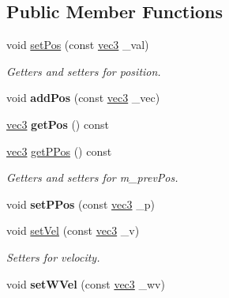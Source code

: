 \subsection*{Public Member Functions}
\begin{DoxyCompactItemize}
\item 
\hypertarget{classbase_a90093f488dc92a1eede40eb47b622ef7}{void \hyperlink{classbase_a90093f488dc92a1eede40eb47b622ef7}{set\-Pos} (const \hyperlink{structvec3}{vec3} \-\_\-val)}\label{classbase_a90093f488dc92a1eede40eb47b622ef7}

\begin{DoxyCompactList}\small\item\em Getters and setters for position. \end{DoxyCompactList}\item 
\hypertarget{classbase_aeaa2eadbc7b45eceadb5a4c2af2e8933}{void {\bfseries add\-Pos} (const \hyperlink{structvec3}{vec3} \-\_\-vec)}\label{classbase_aeaa2eadbc7b45eceadb5a4c2af2e8933}

\item 
\hypertarget{classbase_ac76c779722a45ea5d1b2acacffc89d3a}{\hyperlink{structvec3}{vec3} {\bfseries get\-Pos} () const }\label{classbase_ac76c779722a45ea5d1b2acacffc89d3a}

\item 
\hypertarget{classbase_a3813c5f44f3353e0e5561e034b0d77c4}{\hyperlink{structvec3}{vec3} \hyperlink{classbase_a3813c5f44f3353e0e5561e034b0d77c4}{get\-P\-Pos} () const }\label{classbase_a3813c5f44f3353e0e5561e034b0d77c4}

\begin{DoxyCompactList}\small\item\em Getters and setters for m\-\_\-prev\-Pos. \end{DoxyCompactList}\item 
\hypertarget{classbase_ac445f374b2d57f6c5bb034cda3a340e2}{void {\bfseries set\-P\-Pos} (const \hyperlink{structvec3}{vec3} \-\_\-p)}\label{classbase_ac445f374b2d57f6c5bb034cda3a340e2}

\item 
\hypertarget{classbase_a55f39acb84460ec5cc72793d96515593}{void \hyperlink{classbase_a55f39acb84460ec5cc72793d96515593}{set\-Vel} (const \hyperlink{structvec3}{vec3} \-\_\-v)}\label{classbase_a55f39acb84460ec5cc72793d96515593}

\begin{DoxyCompactList}\small\item\em Setters for velocity. \end{DoxyCompactList}\item 
\hypertarget{classbase_abb66dade6add41fd6a85cb1052486127}{void {\bfseries set\-W\-Vel} (const \hyperlink{structvec3}{vec3} \-\_\-wv)}\label{classbase_abb66dade6add41fd6a85cb1052486127}


\end{DoxyCompactItemize}
